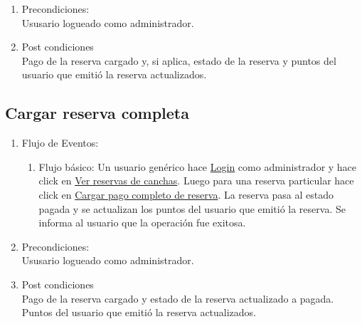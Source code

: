 \documentclass[a4paper,11pt]{article}
\begin{document}
\begin{enumerate}
\begin{enumerate}
    \end{enumerate}

    \item Precondiciones: \\
        Ususario logueado como administrador.

    \item Post condiciones \\
        Pago de la reserva cargado y, si aplica, estado de la reserva y puntos
        del usuario que emitió la reserva actualizados.

\end{enumerate}

\subsection{Cargar reserva completa}
\begin{enumerate}


    \begin{enumerate}
    \item Descripción breve: \\
        Se carga un pago completo para una determinada reserva.
    \item Actores \\
        Administrador.
    \item Disparadores: \\
        Click en el botón \underline{Cargar pago completo de reserva} dentro de la
        página que muestra las reservas para una cancha.
    \end{enumerate}

    \item Flujo de Eventos: 

    \begin{enumerate}

        \item Flujo básico:
            Un usuario genérico hace \underline{Login} como administrador y
            hace click en \underline{Ver reservas de canchas}. Luego para una
            reserva particular hace click en
            \underline{Cargar pago completo de reserva}. La reserva pasa al
            estado pagada y se actualizan los puntos del usuario que emitió la
            reserva. Se informa al usuario que la operación fue exitosa.

    \end{enumerate}

    \item Precondiciones: \\
        Ususario logueado como administrador.

    \item Post condiciones \\
        Pago de la reserva cargado y estado de la reserva actualizado a pagada.
        Puntos del usuario que emitió la reserva actualizados.

\end{enumerate}
\end{document}
